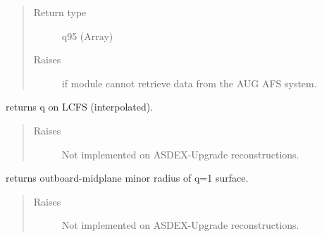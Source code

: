 \documentclass[letterpaper,10pt,english]{sphinxmanual}
\begin{document}
\begin{fulllineitems}
\begin{fulllineitems}
\begin{quote}
\begin{description}
\item[{Return type}] \leavevmode
q95 (Array)

\item[{Raises}] \leavevmode
{} \textendash{} if module cannot retrieve data from the AUG AFS system.

\end{description}\end{quote}

\end{fulllineitems}


\begin{fulllineitems}
\label{\detokenize{eqtools:eqtools.AUGData.AUGDDData.getQLCFS}}
returns q on LCFS (interpolated).
\begin{quote}\begin{description}
\item[{Raises}] \leavevmode
{} \textendash{} Not implemented on ASDEX-Upgrade reconstructions.

\end{description}\end{quote}

\end{fulllineitems}


\begin{fulllineitems}
\label{\detokenize{eqtools:eqtools.AUGData.AUGDDData.getQ1Surf}}
returns outboard-midplane minor radius of q=1 surface.
\begin{quote}\begin{description}
\item[{Raises}] \leavevmode
{} \textendash{} Not implemented on ASDEX-Upgrade reconstructions.

\end{description}\end{quote}

\end{fulllineitems}


\end{fulllineitems}
\end{document}
